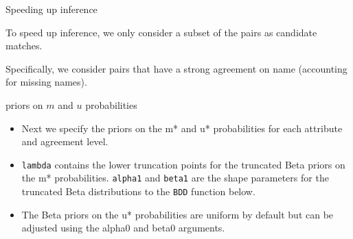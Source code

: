 \documentclass[
  ignorenonframetext,
]{beamer}
\newenvironment{Shaded}{\begin{snugshade}}{\end{snugshade}}
\newcommand{\DecValTok}[1]{\textcolor[rgb]{0.00,0.00,0.81}{#1}}
\newcommand{\KeywordTok}[1]{\textcolor[rgb]{0.13,0.29,0.53}{\textbf{#1}}}
\newcommand{\NormalTok}[1]{#1}
\newcommand{\OperatorTok}[1]{\textcolor[rgb]{0.81,0.36,0.00}{\textbf{#1}}}
\newcommand{\StringTok}[1]{\textcolor[rgb]{0.31,0.60,0.02}{#1}}
\begin{document}
\begin{frame}[fragile]{Speeding up inference}
\protect\hypertarget{speeding-up-inference-1}{}

To speed up inference, we only consider a subset of the pairs as
candidate matches.

Specifically, we consider pairs that have a strong agreement on name
(accounting for missing names).

\vspace*{1em}

\tiny

\begin{Shaded}
\end{Shaded}

\end{frame}

\begin{frame}[fragile]{priors on \(m\) and \(u\) probabilities}
\protect\hypertarget{priors-on-m-and-u-probabilities}{}

\begin{itemize}
\item
  Next we specify the priors on the m* and u* probabilities for each
  attribute and agreement level.
\item
  \texttt{lambda} contains the lower truncation points for the truncated
  Beta priors on the m* probabilities. \texttt{alpha1} and
  \texttt{beta1} are the shape parameters for the truncated Beta
  distributions to the \texttt{BDD} function below.
\item
  The Beta priors on the u* probabilities are uniform by default but can
  be adjusted using the alpha0 and beta0 arguments.
\end{itemize}

\end{frame}
\end{document}
